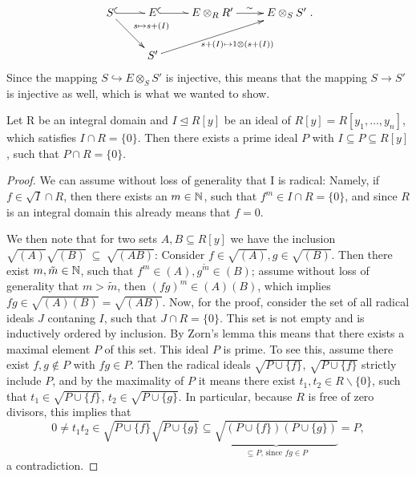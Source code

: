\begin{prop}
\begin{bew}
\[\begin{xy}
 \xymatrix{
      S \ar@^{(->}[r] \ar[rd]^-{ s \mapsto s + (I)} &E \ar@^{(->}[r] & E \otimes_R R' \ar[r]^\sim & E \otimes_S S' \\ 
      & S' \ar[urr]_-{~~~~~ s + (I) \mapsto 1 \otimes (s + (I)) }}
\end{xy}.
\]
Since the mapping $S \hookrightarrow E \otimes_S S'$ is injective, this means that the mapping $S \rightarrow S'$ is injective as well, which is what we wanted to show.
\end{bew}
\end{prop}


\begin{lem}\label{primeoverp1}
Let R be an integral domain and $I \unlhd R[y]$ be an ideal of $R[y] = R[y_1,\ldots,y_n]$, which satisfies $I \cap R = \{ 0 \}$.
Then there exists a prime ideal $P$ with $I \subseteq P \subseteq R[y] $, such that $P \cap R = \{0\}$.
\begin{proof}
We can assume without loss of generality that I is radical:
Namely, if $f \in \sqrt{I} \cap R$, then there exists an $m \in \mathbb{N}$, such that $f^m \in I \cap R = \{0\}$, and since $R$ is an integral domain this already means that $f = 0$. 

We then note that for two sets $A,B \subseteq R[y]$ we have the inclusion \\ $\sqrt{(A)}\sqrt{(B)}~\subseteq~\sqrt{(AB)}$: Consider $f \in \sqrt{(A)}, g \in \sqrt{(B)}$. Then there exist $m, \tilde m \in \mathbb{N}$, such that $f^m \in (A), g^{\tilde m} \in (B)$;
 assume without loss of generality that $m > \tilde m$, then $(fg)^m \in (A)(B)$, which implies $fg \in \sqrt{(A)(B)} = \sqrt{(AB)}$.
Now, for the proof, consider the set of all radical ideals $J$ contaning $I$, such that $J \cap R = \{0\}$. This set is not empty and is inductively ordered by inclusion.
By Zorn's lemma this means that there exists a maximal element $P$ of this set. This ideal $P$ is prime. To see this, assume there exist $f,g \notin P$ with $fg \in P$. 
Then the radical ideals $\sqrt{P \cup \{f\}}$, $\sqrt{P \cup \{f\}}$ strictly include $P$, and by the maximality of $P$ it means there exist $t_1, t_2 \in R\backslash\{0\}$, such that
$t_1 \in \sqrt{P \cup \{f\}}$, $t_2 \in \sqrt{P \cup \{g\}}$. In particular, because $R$ is free of zero divisors, this implies that
 \[0 \neq t_1t_2 \in \sqrt{P \cup \{f\}}\sqrt{P \cup \{g\}} \subseteq  \underbrace{\sqrt{(P \cup \{f\})(P \cup \{g\})}}_{\subseteq P\text{, since }fg \in P} = P, \]
a contradiction.
\end{proof}
\end{lem}

